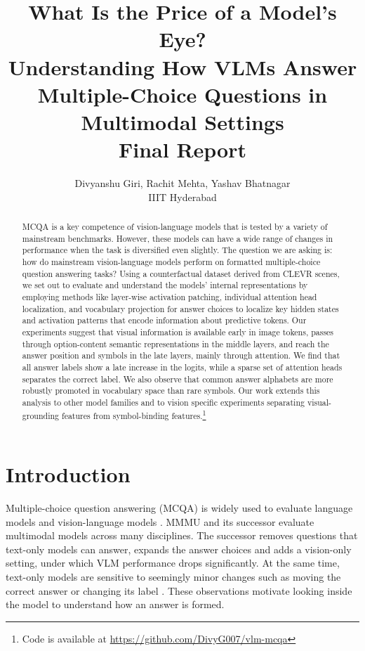 \documentclass[11pt]{article}
\title{What Is the Price of a Model's Eye?\\
Understanding How VLMs Answer Multiple-Choice Questions in Multimodal Settings\\
Final Report}
\author{Divyanshu Giri, Rachit Mehta, Yashav Bhatnagar \\
        IIIT Hyderabad}
\begin{document}
\maketitle

\begin{abstract}
MCQA is a key competence of vision-language
models that is tested by a variety of mainstream
benchmarks. However, these models can have
a wide range of changes in performance when
the task is diversified even slightly. The question we are asking is: how do mainstream
vision-language models perform on formatted multiple-choice question answering tasks?
Using a counterfactual dataset derived from
CLEVR scenes, we set out to evaluate and understand the models’ internal representations
by employing methods like layer-wise activation patching, individual attention head localization, and vocabulary projection for answer
choices to localize key hidden states and activation patterns that encode information about
predictive tokens. Our experiments suggest that visual information is available early in
image tokens, passes through option-content semantic representations in the middle layers, and
reach the answer position and symbols in the
late layers, mainly through attention. We find
that all answer labels show a late increase in the
logits, while a sparse set of attention heads separates the correct label. We also observe that
common answer alphabets are more robustly
promoted in vocabulary space than rare symbols. Our work  extends this analysis to other model families and to vision specific experiments separating visual-grounding
features from symbol-binding features.\footnote{Code is available at \url{https://github.com/DivyG007/vlm-mcqa}}
\end{abstract}

\section{Introduction}

Multiple-choice question answering (MCQA) is widely used to evaluate language models \citep{wiegreffe2025answerassembleaceunderstanding} and vision-language models \citep{meng2024mmiumultimodalmultiimageunderstanding}. MMMU \citep{yue2024mmmu} and its successor \citep{yue2025mmmuprorobustmultidisciplinemultimodal} evaluate multimodal models across many disciplines. The successor removes questions that text-only models can answer, expands the answer choices and adds a vision-only setting, under which VLM performance drops significantly. At the same time, text-only models are sensitive to seemingly minor changes such as moving the correct answer or changing its label \citep{pezeshkpour2024large,alzahrani2024when,khatun2024study,zheng2024large}. These observations motivate looking inside the model to understand how an answer is formed.
\end{document}
